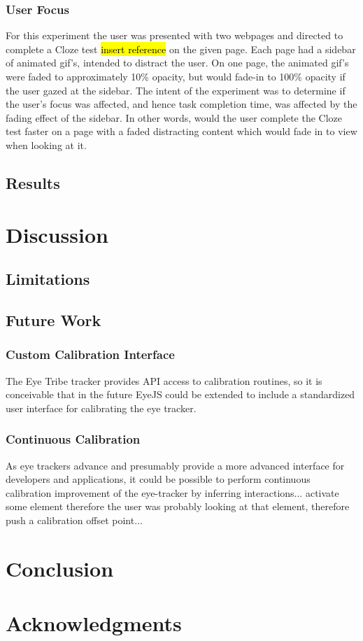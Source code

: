 \documentclass{sigchi}
\begin{document}
\subsubsection{User Focus}
For this experiment the user was presented with two webpages and 
directed to complete a Cloze test \hl{insert reference} on the given
page. Each page had a sidebar of animated gif's, intended to distract
the user. On one page, the animated gif's were faded to approximately
10\% opacity, but would fade-in to 100\% opacity if the user gazed at
the sidebar. The intent of the experiment was to determine if the user's
focus was affected, and hence task completion time, was affected by
the fading effect of the sidebar. In other words, would the user complete
the Cloze test faster on a page with a faded distracting content which
would fade in to view when looking at it.

\subsection{Results}

\section{Discussion}

\subsection{Limitations}

\subsection{Future Work}

\subsubsection{Custom Calibration Interface}
The Eye Tribe tracker provides API access to calibration routines, so
it is conceivable that in the future EyeJS could be extended to include
a standardized user interface for calibrating the eye tracker.

\subsubsection{Continuous Calibration}
As eye trackers advance and presumably provide a more advanced interface
for developers and applications, it could be possible to perform
continuous calibration improvement of the eye-tracker by inferring
interactions... activate some element therefore the user was probably
looking at that element, therefore push a calibration offset point...

\section{Conclusion}

\section{Acknowledgments}

\balance{}



\end{document}
